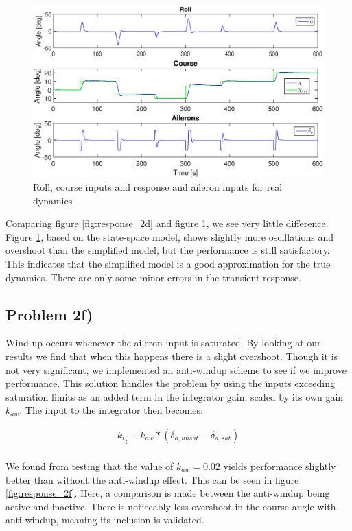 \begin{figure}
    \centering
    \includegraphics[width=\textwidth]{prob2e.eps}
    \caption{Roll, course inputs and response and aileron inputs for real dynamics}
    \label{fig:response_2e}
\end{figure}

Comparing figure \ref{fig:response_2d} and figure \ref{fig:response_2e}, we see very little difference. Figure \ref{fig:response_2e}, based on the state-space model, shows slightly more oscillations and overshoot than the simplified model, but the performance is still satisfactory. This indicates that the simplified model is a good approximation for the true dynamics. There are only some minor errors in the transient response. 

\subsection*{Problem 2f)}

Wind-up occurs whenever the aileron input is saturated. By looking at our results we find that when this happens there is a slight overshoot. Though it is not very significant, we implemented an anti-windup scheme to see if we improve performance.
This solution handles the problem by using the inputs exceeding saturation limits as an added term in the integrator gain, scaled by its own gain $k_{aw}$. The input to the integrator then becomes:

\begin{align}
    k_{i_{\chi}}+k_{aw}*(\delta_{a, unsat}-\delta_{a, sat}) \\
\end{align}

We found from testing that the value of $k_{aw}=0.02$ yields performance slightly better than without the anti-windup effect. This can be seen in figure \ref{fig:response_2f}. Here, a comparison is made between the anti-windup being active and inactive. There is noticeably less overshoot in the course angle with anti-windup, meaning its inclusion is validated.

